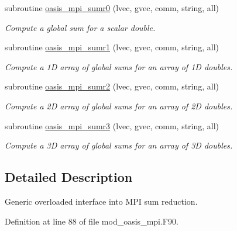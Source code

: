 \begin{DoxyCompactItemize}
subroutine \hyperlink{interfacemod__oasis__mpi_1_1oasis__mpi__sum_aef927bb26681ca81b005940fad26d27f}{oasis\+\_\+mpi\+\_\+sumr0} (lvec, gvec, comm, string, all)
\begin{DoxyCompactList}\small\item\em Compute a global sum for a scalar double. \end{DoxyCompactList}\item 
subroutine \hyperlink{interfacemod__oasis__mpi_1_1oasis__mpi__sum_a509c6561bf7677ca44df5727ec7af8bf}{oasis\+\_\+mpi\+\_\+sumr1} (lvec, gvec, comm, string, all)
\begin{DoxyCompactList}\small\item\em Compute a 1\+D array of global sums for an array of 1\+D doubles. \end{DoxyCompactList}\item 
subroutine \hyperlink{interfacemod__oasis__mpi_1_1oasis__mpi__sum_a45b443ca4b94c71ad7be5e6b653d8b1f}{oasis\+\_\+mpi\+\_\+sumr2} (lvec, gvec, comm, string, all)
\begin{DoxyCompactList}\small\item\em Compute a 2\+D array of global sums for an array of 2\+D doubles. \end{DoxyCompactList}\item 
subroutine \hyperlink{interfacemod__oasis__mpi_1_1oasis__mpi__sum_a31d24332ccc66502fcb78e5f69d19c45}{oasis\+\_\+mpi\+\_\+sumr3} (lvec, gvec, comm, string, all)
\begin{DoxyCompactList}\small\item\em Compute a 3\+D array of global sums for an array of 3\+D doubles. \end{DoxyCompactList}\end{DoxyCompactItemize}


\subsection{Detailed Description}
Generic overloaded interface into M\+P\+I sum reduction. 

Definition at line 88 of file mod\+\_\+oasis\+\_\+mpi.\+F90.



